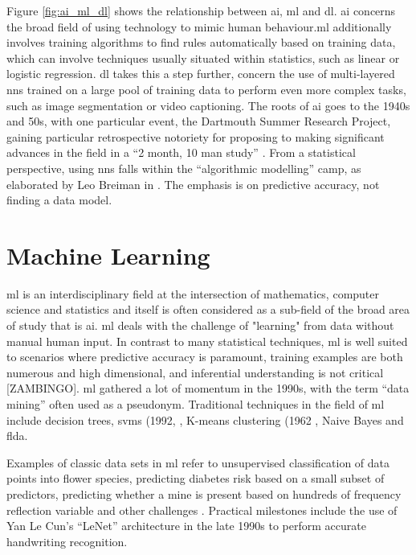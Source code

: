 Figure \ref{fig:ai_ml_dl} shows the relationship between \gls{ai}, \gls{ml} and \gls{dl}. \gls{ai} concerns the broad field of using technology to mimic human behaviour.\gls{ml} additionally involves training algorithms to find rules automatically based on training data, which can involve techniques usually situated within statistics, such as linear or logistic regression. \gls{dl} takes this a step further, concern the use of multi-layered \gls{nn}s trained on a large pool of training data to perform even more complex tasks, such as image segmentation or video captioning. The roots of \gls{ai} goes to the 1940s and 50s, with one particular event, the Dartmouth Summer Research Project, gaining particular retrospective notoriety for proposing to making significant advances in the field in a \enquote{2 month, 10 man study}  \cite{dartmouth_summer}. From a statistical perspective, using \gls{nn}s falls within the \enquote{algorithmic modelling} camp, as elaborated by Leo Breiman in \cite{two_cultures}. The emphasis is on predictive accuracy, not finding a data model.

\section{Machine Learning}

\gls{ml} is an interdisciplinary field at the intersection of mathematics, computer science and statistics and itself is often considered as a sub-field of the broad area of study that is  \gls{ai}. \gls{ml} deals with the challenge of "learning" from data without manual human input. In contrast to many statistical techniques, \gls{ml} is well suited to scenarios where predictive accuracy is paramount, training examples are both numerous and high dimensional, and inferential understanding is not critical [ZAMBINGO]. \gls{ml} gathered a lot of momentum in the 1990s, with the term \enquote{data mining} often used as a pseudonym. Traditional techniques in the field of \gls{ml} include decision trees,  \gls{svm}s (1992, \cite{svm}, K-means clustering (1962 \cite{k_means}, Naive Bayes and  \gls{flda}.  \bigskip

Examples of classic data sets in \gls{ml} refer to unsupervised classification of data points into flower species, predicting diabetes risk based on a small subset of predictors, predicting whether a mine is present based on hundreds of frequency reflection variable and other challenges \cite{uci_ml_data}. Practical milestones include the use of Yan Le Cun's \enquote{LeNet} architecture in the late 1990s to perform accurate handwriting recognition. 

